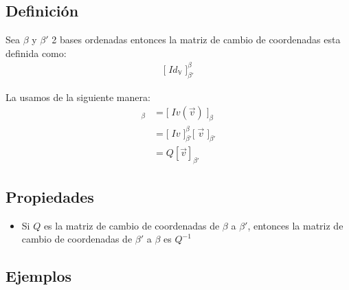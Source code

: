 \documentclass[12pt, fleqn]{report}                             %
\theoremstyle{break}                                            %
\DeclareMathOperator \VectorSet    {\mathbb{V}}                 %
\newcommand{\BigBrackets}[1] {\Big[ \; #1 \; \Big]}             %
\begin{document}
            \subsection{Definición}

                Sea $\beta$ y $\beta'$ 2 bases ordenadas entonces la matriz de cambio de coordenadas
                esta definida como:
                \begin{align*}
                    \BigBrackets{Id_{\VectorSet}}_{\beta'}^{\beta}
                \end{align*}

                La usamos de la siguiente manera:
                \begin{align*}
                    [\vec v]_\beta 
                       &= \BigBrackets{Iv(\vec v)}_\beta                                    \\
                       &= \BigBrackets{Iv}_{\beta'}^\beta \BigBrackets{\vec v}_{\beta'}     \\
                       &= Q [\vec v]_{\beta'}
                \end{align*}



            \subsection{Propiedades}

                \begin{itemize}
                    \item 
                        Si $Q$ es la matriz de cambio de coordenadas de $\beta$ a $\beta'$,
                        entonces la matriz de cambio de coordenadas de $\beta'$ a $\beta$
                        es $Q^{-1}$
                \end{itemize}



            \clearpage
            \subsection{Ejemplos}
\end{document}
